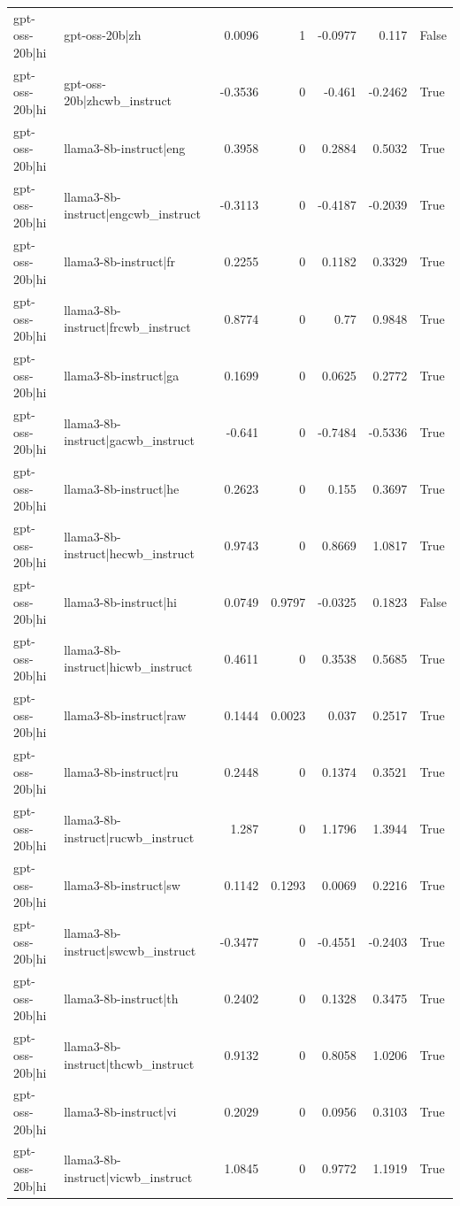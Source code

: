 \begin{table}
\begin{tabular}{l l r r r r l}
gpt-oss-20b|hi & gpt-oss-20b|zh & 0.0096 & 1 & -0.0977 & 0.117 & False \\
gpt-oss-20b|hi & gpt-oss-20b|zhcwb_instruct & -0.3536 & 0 & -0.461 & -0.2462 & True \\
gpt-oss-20b|hi & llama3-8b-instruct|eng & 0.3958 & 0 & 0.2884 & 0.5032 & True \\
gpt-oss-20b|hi & llama3-8b-instruct|engcwb_instruct & -0.3113 & 0 & -0.4187 & -0.2039 & True \\
gpt-oss-20b|hi & llama3-8b-instruct|fr & 0.2255 & 0 & 0.1182 & 0.3329 & True \\
gpt-oss-20b|hi & llama3-8b-instruct|frcwb_instruct & 0.8774 & 0 & 0.77 & 0.9848 & True \\
gpt-oss-20b|hi & llama3-8b-instruct|ga & 0.1699 & 0 & 0.0625 & 0.2772 & True \\
gpt-oss-20b|hi & llama3-8b-instruct|gacwb_instruct & -0.641 & 0 & -0.7484 & -0.5336 & True \\
gpt-oss-20b|hi & llama3-8b-instruct|he & 0.2623 & 0 & 0.155 & 0.3697 & True \\
gpt-oss-20b|hi & llama3-8b-instruct|hecwb_instruct & 0.9743 & 0 & 0.8669 & 1.0817 & True \\
gpt-oss-20b|hi & llama3-8b-instruct|hi & 0.0749 & 0.9797 & -0.0325 & 0.1823 & False \\
gpt-oss-20b|hi & llama3-8b-instruct|hicwb_instruct & 0.4611 & 0 & 0.3538 & 0.5685 & True \\
gpt-oss-20b|hi & llama3-8b-instruct|raw & 0.1444 & 0.0023 & 0.037 & 0.2517 & True \\
gpt-oss-20b|hi & llama3-8b-instruct|ru & 0.2448 & 0 & 0.1374 & 0.3521 & True \\
gpt-oss-20b|hi & llama3-8b-instruct|rucwb_instruct & 1.287 & 0 & 1.1796 & 1.3944 & True \\
gpt-oss-20b|hi & llama3-8b-instruct|sw & 0.1142 & 0.1293 & 0.0069 & 0.2216 & True \\
gpt-oss-20b|hi & llama3-8b-instruct|swcwb_instruct & -0.3477 & 0 & -0.4551 & -0.2403 & True \\
gpt-oss-20b|hi & llama3-8b-instruct|th & 0.2402 & 0 & 0.1328 & 0.3475 & True \\
gpt-oss-20b|hi & llama3-8b-instruct|thcwb_instruct & 0.9132 & 0 & 0.8058 & 1.0206 & True \\
gpt-oss-20b|hi & llama3-8b-instruct|vi & 0.2029 & 0 & 0.0956 & 0.3103 & True \\
gpt-oss-20b|hi & llama3-8b-instruct|vicwb_instruct & 1.0845 & 0 & 0.9772 & 1.1919 & True \\

\end{tabular}
\end{table}
